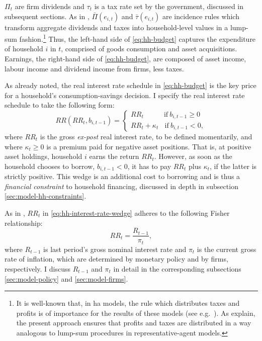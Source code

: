 \documentclass[12pt]{article} %
\numberwithin{equation}{section} %
\begin{document}
$\Pi_t$ are firm dividends and $\tau_t$ is a tax rate set by the government, discussed in subsequent sections. As in \textcite{mckay2016}, $\bar{\Pi} (e_{i,t})$ and $\bar{\tau} (e_{i,t})$ are incidence rules which transform aggregate dividends and taxes into household-level values in a lump-sum fashion.\footnote{It is well-known that, in \Gls{ha} models, the rule which distributes taxes and profits is of importance for the results of these models (see e.g.~\cite{kaplan2018}). As \textcite{mckay2016} explain, the present approach ensures that profits and taxes are distributed in a way analogous to lump-sum procedures in representative-agent models.} Thus, the left-hand side of \eqref{eq:hh-budget} captures the expenditure of household $i$ in $t$, comprised of goods consumption and asset acquisitions. Earnings, the right-hand side of \eqref{eq:hh-budget}, are composed of asset income, labour income and dividend income from firms, less taxes.


As already noted, the real interest rate schedule in \eqref{eq:hh-budget} is the key price for a household's consumption-savings decision. I specify the real interest rate schedule to take the following form:
\begin{equation}
    RR (RR_t, b_{i,t-1}) = \begin{cases}
	RR_t \ \ \ \ \ \ \ \ \ \ \ \ \ \text{if} \ b_{i,t-1} \ge 0 \\
	RR_t + \kappa_t \ \ \ \ \text{if} \ b_{i,t-1} < 0,
	\end{cases} \label{eq:hh-interest-rate-wedge}
\end{equation}
where $RR_t$ is the gross \textit{ex-post} real interest rate, to be defined momentarily, and where $\kappa_t \ge 0$ is a premium paid for negative asset positions. That is, at positive asset holdings, household $i$ earns the return $RR_t$. However, as soon as the household chooses to borrow, $b_{i,t-1} < 0$, it has to pay $RR_t$ plus $\kappa_t$, if the latter is strictly positive. This wedge is an additional cost to borrowing and is thus a \textit{financial constraint} to household financing, discussed in depth in subsection \ref{sec:model-hh-constraints}.

As in \textcite{auclert2021}, $RR_t$ in \eqref{eq:hh-interest-rate-wedge} adheres to the following Fisher relationship:
\begin{equation}
    RR_t = \frac{R_{t-1}}{\pi_t}, \label{eq:hh-fisher-equation}
\end{equation}
where $R_{t-1}$ is last period's gross nominal interest rate and $\pi_t$ is the current gross rate of inflation, which are determined by monetary policy and by firms, respectively. I discuss $R_{t-1}$ and $\pi_t$ in detail in the corresponding subsections \ref{sec:model-policy} and \ref{sec:model-firms}.
\end{document}
